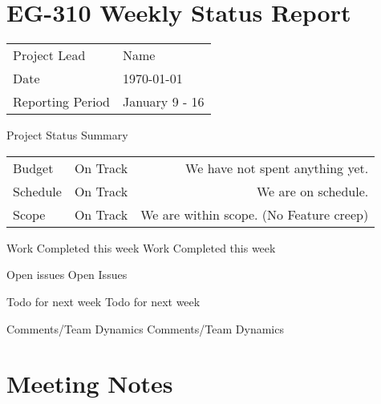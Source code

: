 \documentclass{scrartcl}
\begin{document}
\section*{EG-310 Weekly Status Report}
\begin{center}
    \begin{tabular}{ l l }
        Project Lead     & Name           \\
        Date             & \today         \\
        Reporting Period & January 9 - 16
    \end{tabular}
\end{center}

\begin{defi}{Project Status Summary}{}
    \begin{tabular}{ l l r }
        Budget   & On Track & We have not spent anything yet.         \\
        Schedule & On Track & We are on schedule.                     \\
        Scope    & On Track & We are within scope. (No Feature creep)
    \end{tabular}
\end{defi}

\begin{defi}{Work Completed this week}{}
    Work Completed this week
\end{defi}

\begin{defi}{Open issues}{}
    Open Issues
\end{defi}

\begin{defi}{Todo for next week}{}
    Todo for next week
\end{defi}

\begin{defi}{Comments/Team Dynamics}{}
    Comments/Team Dynamics
\end{defi}


\pagebreak
\section{Meeting Notes}

\end{document}
